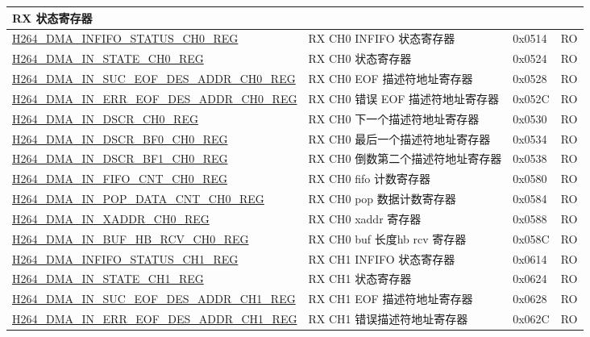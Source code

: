 \begin{longtable}{ | p{7.5cm} | p{5.7cm} | p{1.2cm} | p{1.5cm} | }
\multicolumn{4}{|l|}{\textbf{RX 状态寄存器}} \\ \hline
    \hyperref[regdesc:H264DMAINFIFOSTATUSCH0REG]{H264\_DMA\_INFIFO\_STATUS\_CH0\_REG} & RX CH0 INFIFO 状态寄存器 & 0x0514 & RO \\ \hline
    \hyperref[regdesc:H264DMAINSTATECH0REG]{H264\_DMA\_IN\_STATE\_CH0\_REG} & RX CH0 状态寄存器 & 0x0524 & RO \\ \hline
    \hyperref[regdesc:H264DMAINSUCEOFDESADDRCH0REG]{H264\_DMA\_IN\_SUC\_EOF\_DES\_ADDR\_CH0\_REG} & RX CH0 EOF 描述符地址寄存器 & 0x0528 & RO \\ \hline
    \hyperref[regdesc:H264DMAINERREOFDESADDRCH0REG]{H264\_DMA\_IN\_ERR\_EOF\_DES\_ADDR\_CH0\_REG} & RX CH0 错误 EOF 描述符地址寄存器 & 0x052C & RO \\ \hline
    \hyperref[regdesc:H264DMAINDSCRCH0REG]{H264\_DMA\_IN\_DSCR\_CH0\_REG} & RX CH0 下一个描述符地址寄存器 & 0x0530 & RO \\ \hline
    \hyperref[regdesc:H264DMAINDSCRBF0CH0REG]{H264\_DMA\_IN\_DSCR\_BF0\_CH0\_REG} & RX CH0 最后一个描述符地址寄存器 & 0x0534 & RO \\ \hline
    \hyperref[regdesc:H264DMAINDSCRBF1CH0REG]{H264\_DMA\_IN\_DSCR\_BF1\_CH0\_REG} & RX CH0 倒数第二个描述符地址寄存器 & 0x0538 & RO \\ \hline
    \hyperref[regdesc:H264DMAINFIFOCNTCH0REG]{H264\_DMA\_IN\_FIFO\_CNT\_CH0\_REG} & RX CH0 fifo 计数寄存器 & 0x0580 & RO \\ \hline
    \hyperref[regdesc:H264DMAINPOPDATACNTCH0REG]{H264\_DMA\_IN\_POP\_DATA\_CNT\_CH0\_REG} & RX CH0 pop 数据计数寄存器 & 0x0584 & RO \\ \hline
    \hyperref[regdesc:H264DMAINXADDRCH0REG]{H264\_DMA\_IN\_XADDR\_CH0\_REG} & RX CH0 xaddr 寄存器 & 0x0588 & RO \\ \hline
    \hyperref[regdesc:H264DMAINBUFHBRCVCH0REG]{H264\_DMA\_IN\_BUF\_HB\_RCV\_CH0\_REG} & RX CH0 buf 长度hb rcv 寄存器 & 0x058C & RO \\ \hline
    \hyperref[regdesc:H264DMAINFIFOSTATUSCH1REG]{H264\_DMA\_INFIFO\_STATUS\_CH1\_REG} & RX CH1 INFIFO 状态寄存器 & 0x0614 & RO \\ \hline
    \hyperref[regdesc:H264DMAINSTATECH1REG]{H264\_DMA\_IN\_STATE\_CH1\_REG} & RX CH1 状态寄存器 & 0x0624 & RO \\ \hline
    \hyperref[regdesc:H264DMAINSUCEOFDESADDRCH1REG]{H264\_DMA\_IN\_SUC\_EOF\_DES\_ADDR\_CH1\_REG} & RX CH1 EOF 描述符地址寄存器 & 0x0628 & RO \\ \hline
    \hyperref[regdesc:H264DMAINERREOFDESADDRCH1REG]{H264\_DMA\_IN\_ERR\_EOF\_DES\_ADDR\_CH1\_REG} & RX CH1 错误描述符地址寄存器 & 0x062C & RO \\ \hline

\end{longtable}
